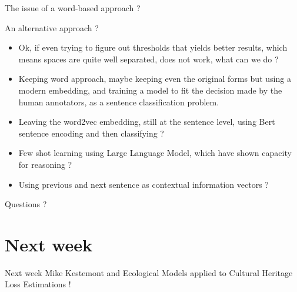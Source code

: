 \documentclass[aspectratio=169]{beamer}
\begin{document}
\begin{frame}{The issue of a word-based approach ?}
\end{frame}

\begin{frame}{An alternative approach ?}
    \begin{itemize}
        \item Ok, if even trying to figure out thresholds that yields better results, which means spaces are quite well separated, does not work, what can we do ?
        \item Keeping word approach, maybe keeping even the original forms but using a modern embedding, and training a model to fit the decision made by the human annotators, as a sentence classification problem.
        \item Leaving the word2vec embedding, still at the sentence level, using Bert sentence encoding and then classifying ?
        \item Few shot learning using Large Language Model, which have shown capacity for reasoning ?
        \item Using previous and next sentence as contextual information vectors ?
    \end{itemize}
\end{frame}

\begin{frame}{Questions ?}
    
\end{frame}

\section{Next week}

\begin{frame}{Next week}
    Mike Kestemont and Ecological Models applied to Cultural Heritage Loss Estimations !    
\end{frame}
\end{document}
